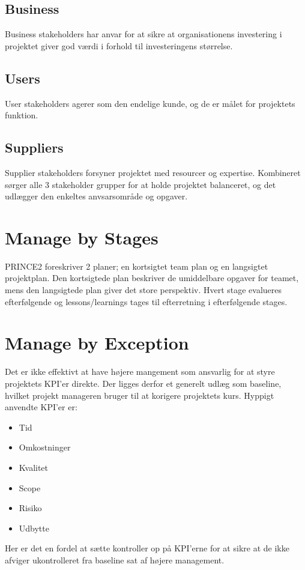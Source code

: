 \subsection*{Business}
Business stakeholders har anvar for at sikre at organisationens investering i projektet giver god værdi i forhold til investeringens størrelse.

\subsection*{Users}
User stakeholders agerer som den endelige kunde, og de er målet for projektets funktion.

\subsection*{Suppliers}
Supplier stakeholders forsyner projektet med resourcer og expertise. Kombineret sørger alle 3 stakeholder grupper for at holde projektet balanceret, og det udlægger den enkeltes anvsarsområde og opgaver.

\section{Manage by Stages}
PRINCE2 foreskriver 2 planer; en kortsigtet team plan og en langsigtet projektplan. Den kortsigtede plan beskriver de umiddelbare opgaver for teamet, mens den langsigtede plan giver det store perspektiv. Hvert stage evalueres efterfølgende og lessons/learnings tages til efterretning i efterfølgende stages.

\section{Manage by Exception}
Det er ikke effektivt at have højere mangement som ansvarlig for at styre projektets KPI'er direkte. Der ligges derfor et generelt udlæg som baseline, hvilket projekt manageren bruger til at korigere projektets kurs. Hyppigt anvendte KPI'er er:
\begin{itemize}
    \item Tid
    \item Omkostninger
    \item Kvalitet
    \item Scope
    \item Risiko
    \item Udbytte
\end{itemize}
Her er det en fordel at sætte kontroller op på KPI'erne for at sikre at de ikke afviger ukontrolleret fra baseline sat af højere management.

